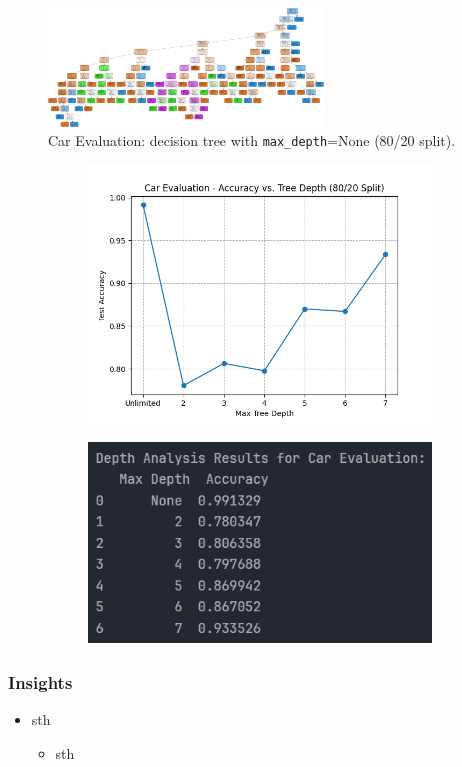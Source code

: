 \begin{figure}[H]
	\centering
	\includegraphics[width=0.65\textwidth]{imgs/dt-mini/dt__car_evaluation__80_vs_20__None.png}
	\caption{Car Evaluation: decision tree with \texttt{max\_depth}=None (80/20 split).}\label{fig:ce-dt-depth-none}
\end{figure}

\begin{figure}[H]
	\centering
	\begin{subfigure}{0.45\textwidth}
		\centering
		\includegraphics[width=\textwidth]{imgs/accuracy_vs_depth_car_evaluation.png}
	\end{subfigure}
	\hfill
	\begin{subfigure}{0.45\textwidth}
		\centering
		\includegraphics[width=\textwidth]{imgs/accuracy_vs_depth_car_evaluation__analysis.png}
	\end{subfigure}
\end{figure}

\clearpage
\subsubsection*{Insights}
\begin{itemize}
	\item sth
	      \begin{itemize}
		      \item sth
	      \end{itemize}
\end{itemize}
